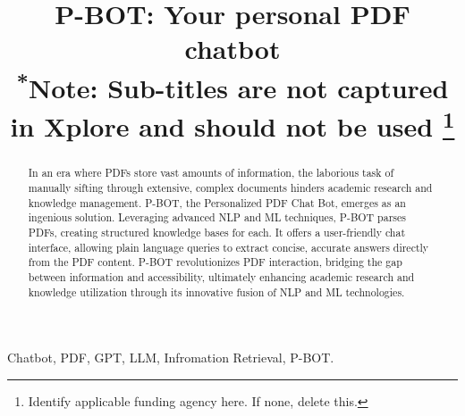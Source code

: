 \documentclass[conference]{IEEEtran}
\begin{document}
\title{P-BOT: Your personal PDF chatbot\\
{\footnotesize \textsuperscript{*}Note: Sub-titles are not captured in Xplore and
should not be used}
\thanks{Identify applicable funding agency here. If none, delete this.}
}

\author{
\and
{}
\and
{}
\and
{}
}

\maketitle

\begin{abstract}
In an era where PDFs store vast amounts of information, the laborious task of manually sifting through extensive, complex documents hinders academic research and knowledge management. P-BOT, the Personalized PDF Chat Bot, emerges as an ingenious solution. Leveraging advanced NLP and ML techniques, P-BOT parses PDFs, creating structured knowledge bases for each. It offers a user-friendly chat interface, allowing plain language queries to extract concise, accurate answers directly from the PDF content. P-BOT revolutionizes PDF interaction, bridging the gap between information and accessibility, ultimately enhancing academic research and knowledge utilization through its innovative fusion of NLP and ML technologies.
\end{abstract}
\baselineskip
\begin{IEEEkeywords}
Chatbot, PDF, GPT, LLM, Infromation Retrieval, P-BOT.
\end{IEEEkeywords}
\end{document}
